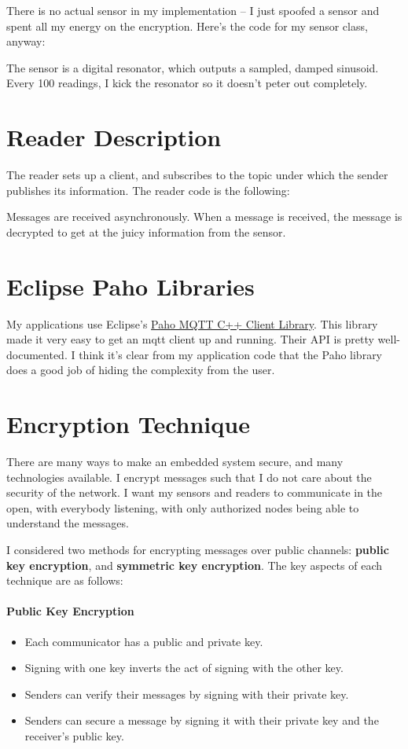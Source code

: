 \documentclass[final,titlepage,onecolumn]{article}
\begin{document}
There is no actual sensor in my implementation -- I just spoofed a sensor and spent all my energy on the encryption. Here's the code for my sensor class, anyway:
\lstset{style=Cpp}

The sensor is a digital resonator, which outputs a sampled, damped sinusoid. Every 100 readings, I kick the resonator so it doesn't peter out completely.

\section{Reader Description}
The reader sets up a client, and subscribes to the topic under which the sender publishes its information. The reader code is the following:
\lstset{style=Cpp}

Messages are received asynchronously. When a message is received, the message is decrypted to get at the juicy information from the sensor.

\section{Eclipse Paho Libraries}
My applications use Eclipse's \href{https://github.com/eclipse/paho.mqtt.cpp}{Paho MQTT C++ Client Library}. This library made it very easy to get an mqtt client up and running. Their API is pretty well-documented. I think it's clear from my application code that the Paho library does a good job of hiding the complexity from the user. 

\section{Encryption Technique}

There are many ways to make an embedded system secure, and many technologies available. I encrypt messages such that I do not care about the security of the network. I want my sensors and readers to communicate in the open, with everybody listening, with only authorized nodes being able to understand the messages.

I considered two methods for encrypting messages over public channels: \textbf{public key encryption}, and \textbf{symmetric key encryption}. The key aspects of each technique are as follows:

\paragraph{Public Key Encryption}
\begin{itemize}
	\item Each communicator has a public and private key.
	\item Signing with one key inverts the act of signing with the other key.
	\item Senders can verify their messages by signing with their private key.
	\item Senders can secure a message by signing it with their private key and the receiver's public key.
\end{itemize}
\end{document}
